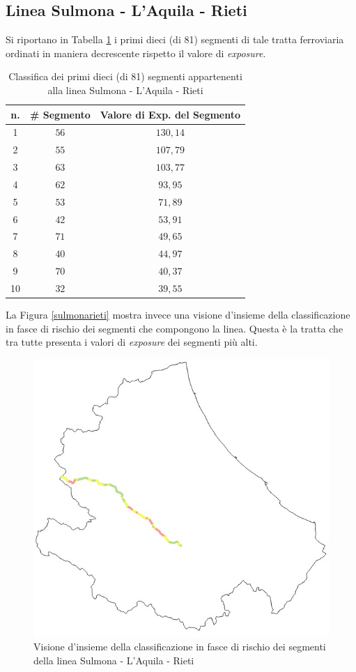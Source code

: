\subsection{Linea Sulmona - L'Aquila - Rieti}
Si riportano in Tabella \ref{classificasulmonarieti} i primi dieci (di 81) segmenti di tale tratta ferroviaria ordinati in maniera decrescente rispetto il valore di \textit{exposure}.
\begin{table}[h]
\centering
\begin{tabular}{|c|c|c|}
\hline
\rowcolor{lightgray}
n. & \# Segmento & Valore di Exp. del Segmento \\ \hline \rowcolor{flamingopink}
1  & $56$        & $130,14$                      \\ \hline \rowcolor{flamingopink}
2  & $55$        & $107,79$                      \\ \hline \rowcolor{flamingopink}
3  & $63$        & $103,77$                      \\ \hline \rowcolor{flamingopink}
4  & $62$        & $93,95$                      \\ \hline \rowcolor{flamingopink}
5  & $53$        & $71,89$                      \\ \hline \rowcolor{flamingopink}
6  & $42$        & $53,91$                      \\ \hline \rowcolor{flamingopink}
7  & $71$       & $49,65$                      \\ \hline \rowcolor{flamingopink}
8  & $40$        & $44,97$                      \\ \hline \rowcolor{flamingopink}
9  & $70$        & $40,37$                      \\ \hline \rowcolor{flamingopink}
10 & $32$        & $39,55$                      \\ \hline
\end{tabular}
\caption{Classifica dei primi dieci (di 81) segmenti appartenenti alla linea Sulmona - L'Aquila - Rieti}
\label{classificasulmonarieti}
\end{table}
\newline
La Figura \ref{sulmonarieti} mostra invece una visione d'insieme della classificazione in fasce di rischio dei segmenti che compongono la linea. Questa è la tratta che tra tutte presenta i valori di \textit{exposure} dei segmenti più alti. 
\begin{figure}[h]
\centering
\includegraphics[width=0.4\linewidth]{img/rietisulmona.jpeg}
\caption{Visione d'insieme della classificazione in fasce di rischio dei segmenti della linea Sulmona - L'Aquila - Rieti}
\label{sulmonacarpinone}
\end{figure}
